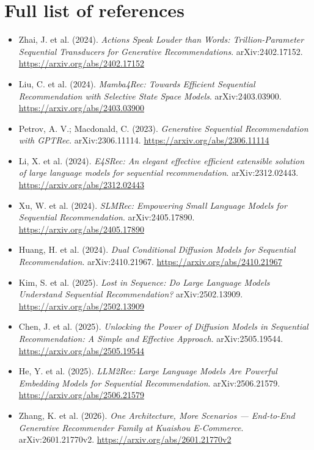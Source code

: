 \documentclass[11pt]{article}
\begin{document}
\section{Full list of references}
\begin{itemize}
  \item Zhai, J. et al. (2024). \emph{Actions Speak Louder than Words: Trillion-Parameter Sequential Transducers for Generative Recommendations}. arXiv:2402.17152. \url{https://arxiv.org/abs/2402.17152}
  \item Liu, C. et al. (2024). \emph{Mamba4Rec: Towards Efficient Sequential Recommendation with Selective State Space Models}. arXiv:2403.03900. \url{https://arxiv.org/abs/2403.03900}
  \item Petrov, A. V.; Macdonald, C. (2023). \emph{Generative Sequential Recommendation with GPTRec}. arXiv:2306.11114. \url{https://arxiv.org/abs/2306.11114}
  \item Li, X. et al. (2024). \emph{E4SRec: An elegant effective efficient extensible solution of large language models for sequential recommendation}. arXiv:2312.02443. \url{https://arxiv.org/abs/2312.02443}
  \item Xu, W. et al. (2024). \emph{SLMRec: Empowering Small Language Models for Sequential Recommendation}. arXiv:2405.17890. \url{https://arxiv.org/abs/2405.17890}
  \item Huang, H. et al. (2024). \emph{Dual Conditional Diffusion Models for Sequential Recommendation}. arXiv:2410.21967. \url{https://arxiv.org/abs/2410.21967}
  \item Kim, S. et al. (2025). \emph{Lost in Sequence: Do Large Language Models Understand Sequential Recommendation?} arXiv:2502.13909. \url{https://arxiv.org/abs/2502.13909}
  \item Chen, J. et al. (2025). \emph{Unlocking the Power of Diffusion Models in Sequential Recommendation: A Simple and Effective Approach}. arXiv:2505.19544. \url{https://arxiv.org/abs/2505.19544}
  \item He, Y. et al. (2025). \emph{LLM2Rec: Large Language Models Are Powerful Embedding Models for Sequential Recommendation}. arXiv:2506.21579. \url{https://arxiv.org/abs/2506.21579}
  \item Zhang, K. et al. (2026). \emph{One Architecture, More Scenarios --- End-to-End Generative Recommender Family at Kuaishou E-Commerce}. arXiv:2601.21770v2. \url{https://arxiv.org/abs/2601.21770v2}
\end{itemize}
\end{document}
